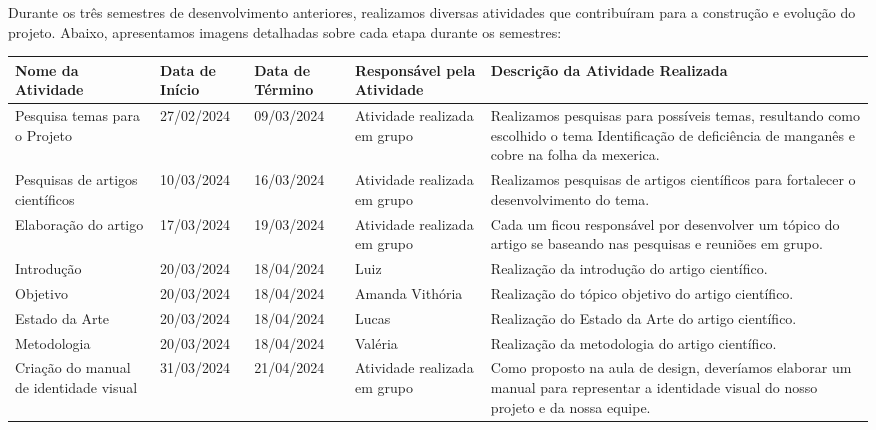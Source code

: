 \medskip
Durante os três semestres de desenvolvimento anteriores, realizamos diversas
atividades que contribuíram para a construção e evolução do projeto. Abaixo,
apresentamos imagens detalhadas sobre cada etapa durante os semestres:
\medskip

\begin{center}
\begin{adjustbox}{max width=\textwidth}
\begin{tabular}{|m{4cm}|m{2.5cm}|m{2.5cm}|m{3cm}|m{8cm}|}
\hline
\textbf{Nome da Atividade} &
\textbf{Data de Início} &
\textbf{Data de Término} &
\textbf{Responsável pela Atividade} &
\textbf{Descrição da Atividade Realizada} \\ \hline

Pesquisa temas para o Projeto & 27/02/2024 & 09/03/2024 & Atividade realizada em grupo &
Realizamos pesquisas para possíveis temas, resultando como escolhido o tema Identificação de deficiência de manganês e cobre na folha da mexerica. \\ \hline

Pesquisas de artigos científicos & 10/03/2024 & 16/03/2024 & Atividade realizada em grupo &
Realizamos pesquisas de artigos científicos para fortalecer o desenvolvimento do tema. \\ \hline

Elaboração do artigo & 17/03/2024 & 19/03/2024 & Atividade realizada em grupo &
Cada um ficou responsável por desenvolver um tópico do artigo se baseando nas pesquisas e reuniões em grupo. \\ \hline

Introdução & 20/03/2024 & 18/04/2024 & Luiz &
Realização da introdução do artigo científico. \\ \hline

Objetivo & 20/03/2024 & 18/04/2024 & Amanda Vithória &
Realização do tópico objetivo do artigo científico. \\ \hline

Estado da Arte & 20/03/2024 & 18/04/2024 & Lucas &
Realização do Estado da Arte do artigo científico. \\ \hline

Metodologia & 20/03/2024 & 18/04/2024 & Valéria &
Realização da metodologia do artigo científico. \\ \hline

Criação do manual de identidade visual & 31/03/2024 & 21/04/2024 & Atividade realizada em grupo &
Como proposto na aula de design, deveríamos elaborar um manual para representar a identidade visual do nosso projeto e da nossa equipe. \\ \hline


\end{tabular}
\end{adjustbox}
\end{center}
